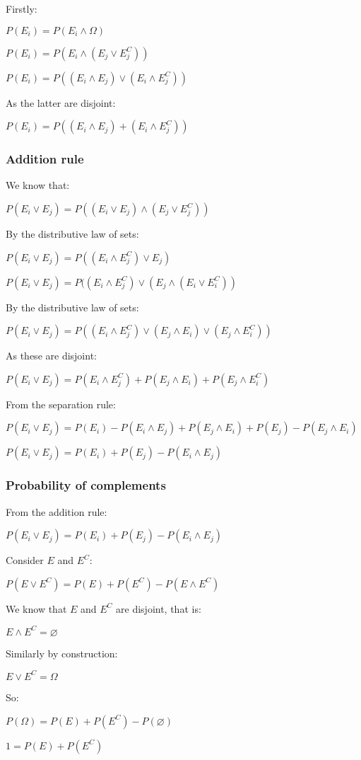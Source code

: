Firstly:

$P(E_i)=P(E_i\land \Omega)$

$P(E_i)=P(E_i\land (E_j\lor E_j^C))$

$P(E_i)=P((E_i\land E_j)\lor (E_i\land E_j^C))$

As the latter are disjoint:

$P(E_i)=P((E_i\land E_j)+(E_i\land E_j^C))$

\subsubsection{Addition rule}

We know that:

$P(E_i\lor E_j)=P((E_i\lor E_j)\land (E_j\lor E_j^C))$

By the distributive law of sets:

$P(E_i\lor E_j)=P((E_i\land E_j^C)\lor E_j)$

$P(E_i\lor E_j)=P((E_i\land E_j^C)\lor (E_j\land (E_i\lor E_i^C))$

By the distributive law of sets:

$P(E_i\lor E_j)=P((E_i\land E_j^C)\lor (E_j\land E_i)\lor (E_j\land E_i^C))$

As these are disjoint:

$P(E_i\lor E_j)=P(E_i\land E_j^C)+ P(E_j\land E_i)+P(E_j\land E_i^C)$

From the separation rule:

$P(E_i\lor E_j)=P(E_i)-P(E_i\land E_j)+ P(E_j\land E_i)+P(E_j)-P(E_j\land E_i)$

$P(E_i\lor E_j)=P(E_i)+P(E_j)-P(E_i\land E_j)$

\subsubsection{Probability of complements}

From the addition rule:

$P(E_i\lor E_j)=P(E_i)+P(E_j)-P(E_i\land E_j)$

Consider \(E\) and \(E^C\):

$P(E\lor E^C)=P(E)+P(E^C)-P(E\land E^C)$

We know that \(E\) and \(E^C\) are disjoint, that is:

$E\land E^C=\varnothing$

Similarly by construction:

$E\lor E^C=\Omega $

So:

$P(\Omega )=P(E)+P(E^C)-P(\varnothing)$

$1=P(E)+P(E^C)$

